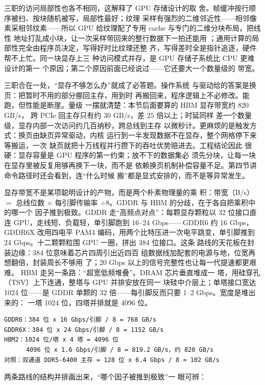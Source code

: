 三职的访问局部性也各不相同，这解释了 GPU 存储设计的取
舍。帧缓冲按行顺序被扫、按块随机被写，局部性最好；纹理
采样有强烈的二维邻近性——相邻像素采相邻纹素——所以
GPU 给纹理配了专用 cache 与专门的二维分块布局，把线性
地址打乱成小块，让一次采样带回来的整行数据下一拍还能用
；通用计算的局部性完全由程序员决定，写得好时比纹理还整
齐，写得差时全是指针追逐，硬件帮不上忙。同一块显存上三
种访问模式并存，是 GPU 存储子系统比 CPU 更难设计的第一
个原因；第二个原因前面已经说过——它还要大一个数量级的
带宽。

三职合在一处，“显存不够怎么办”就成了必答题。操作系统
与驱动给的答案是换页：把暂时不用的部分挪回主存，用到时
再搬回来，程序逻辑上不必修改。能跑，但性能是断崖。量级
一摆就清楚：本节后面要算的 HBM 显存带宽约 820 GB/s，
跨 PCIe 回主存只有约 30 GB/s，差 $25$ 倍以上；时延同样
差一个数量级，显存内部一次访问约几百纳秒，跨总线到主存
以微秒计。更麻烦的是触发方式：换页由缺页异常驱动，内核
运行到一半发现数据不在显存，整个网格停下来等搬运，一次
缺页就把十万线程并行攒下的吞吐优势赔进去。工程结论因此
很硬：显存容量是 GPU 程序的第一约束；放不下的数据集必
须先分块，让每一块在显存里被反复用够再换下一块，而不是
依赖换页机制补偿容量不足。第四节讲命令路径时还会看到，连“什么时候
搬”都是显式安排的，而不是等异常发生。

显存带宽不是某项聪明设计的产物，而是两个朴素物理量的乘
积：带宽（B/s）$=$ 总线位数 $\times$ 每引脚传输率
$\div8$。GDDR 与 HBM 的分歧，在于各自把乘积中的哪一个
因子推到极致。GDDR 走“高频点对点”：每颗显存颗粒以
32 位接口直连 GPU，走线短、负载轻，单引脚跑到
16--24 Gbps——GDDR6 约 16 Gbps，GDDR6X 改用四电平
PAM4 编码，用两个比特压进一次电平跳变，单引脚推到
24 Gbps。十二颗颗粒围 GPU 一圈，拼出 384 位接口。这条
路线的天花板在封装边缘：384 位意味着芯片四周引出近四百
组数据线加配套的电源与地，位宽再想翻倍，封装周长不够用
了；20 Gbps 以上的信号完整性也让每一代提速都更艰难。
HBM 走另一条路：“超宽低频堆叠”。DRAM 芯片垂直堆成一
塔，用硅穿孔（TSV）上下连通，整塔与 GPU 并排安放在同一
块硅中介层上；单塔接口宽达 1024 位——是 GDDR 单颗的
32 倍——每引脚反而只要 1--2 Gbps。宽度是堆出来的：
一塔 1024 位，四塔并排就是 4096 位。

\begin{lstlisting}
GDDR6：384 位 x 16 Gbps/引脚 / 8 = 768 GB/s
GDDR6X：384 位 x 24 Gbps/引脚 / 8 = 1152 GB/s
HBM2：1024 位/塔 x 4 塔 = 4096 位
      4096 位 x 1.6 Gbps/引脚 / 8 = 819.2 GB/s，约 820 GB/s
对照：双通道 DDR5-6400 主存 = 128 位 x 6.4 Gbps / 8 ≈ 102 GB/s
\end{lstlisting}

两条路线的结构并排画出来，“哪个因子被推到极致”一
眼可辨：

